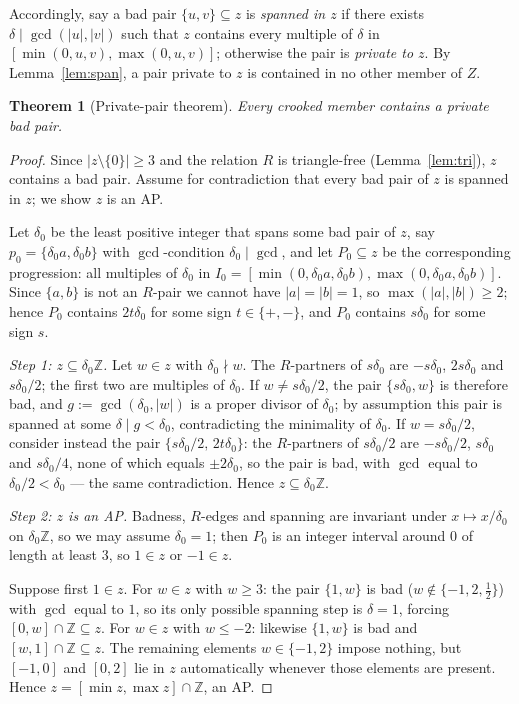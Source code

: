 \documentclass[11pt]{article}
\newtheorem{theorem}{Theorem}[section]
\theoremstyle{definition}
\newcommand{\Z}{\mathbb{Z}}
\begin{document}
Accordingly, say a bad pair $\{u,v\}\subseteq z$ is \emph{spanned in $z$} if there exists $\delta\mid\gcd(|u|,|v|)$ such that $z$ contains every multiple of $\delta$ in $[\min(0,u,v),\max(0,u,v)]$; otherwise the pair is \emph{private to $z$}. By Lemma~\ref{lem:span}, a pair private to $z$ is contained in no other member of $Z$.

\begin{theorem}[Private-pair theorem]\label{thm:private}
Every crooked member contains a private bad pair.
\end{theorem}

\begin{proof}
Since $|z\setminus\{0\}|\ge 3$ and the relation $R$ is triangle-free (Lemma~\ref{lem:tri}), $z$ contains a bad pair. Assume for contradiction that every bad pair of $z$ is spanned in $z$; we show $z$ is an AP.

Let $\delta_0$ be the least positive integer that spans some bad pair of $z$, say $p_0=\{\delta_0 a,\delta_0 b\}$ with $\gcd$-condition $\delta_0\mid\gcd$, and let $P_0\subseteq z$ be the corresponding progression: all multiples of $\delta_0$ in $I_0=[\min(0,\delta_0a,\delta_0b),\max(0,\delta_0a,\delta_0b)]$. Since $\{a,b\}$ is not an $R$-pair we cannot have $|a|=|b|=1$, so $\max(|a|,|b|)\ge2$; hence $P_0$ contains $2t\delta_0$ for some sign $t\in\{+,-\}$, and $P_0$ contains $s\delta_0$ for some sign $s$.

\emph{Step 1: $z\subseteq\delta_0\mathbb{Z}$.} Let $w\in z$ with $\delta_0\nmid w$. The $R$-partners of $s\delta_0$ are $-s\delta_0$, $2s\delta_0$ and $s\delta_0/2$; the first two are multiples of $\delta_0$. If $w\neq s\delta_0/2$, the pair $\{s\delta_0,w\}$ is therefore bad, and $g:=\gcd(\delta_0,|w|)$ is a proper divisor of $\delta_0$; by assumption this pair is spanned at some $\delta\mid g<\delta_0$, contradicting the minimality of $\delta_0$. If $w=s\delta_0/2$, consider instead the pair $\{s\delta_0/2,\,2t\delta_0\}$: the $R$-partners of $s\delta_0/2$ are $-s\delta_0/2$, $s\delta_0$ and $s\delta_0/4$, none of which equals $\pm2\delta_0$, so the pair is bad, with $\gcd$ equal to $\delta_0/2<\delta_0$ --- the same contradiction. Hence $z\subseteq\delta_0\mathbb{Z}$.

\emph{Step 2: $z$ is an AP.} Badness, $R$-edges and spanning are invariant under $x\mapsto x/\delta_0$ on $\delta_0\mathbb{Z}$, so we may assume $\delta_0=1$; then $P_0$ is an integer interval around $0$ of length at least $3$, so $1\in z$ or $-1\in z$.

Suppose first $1\in z$. For $w\in z$ with $w\ge3$: the pair $\{1,w\}$ is bad ($w\notin\{-1,2,\tfrac12\}$) with $\gcd$ equal to $1$, so its only possible spanning step is $\delta=1$, forcing $[0,w]\cap\Z\subseteq z$. For $w\in z$ with $w\le-2$: likewise $\{1,w\}$ is bad and $[w,1]\cap\Z\subseteq z$. The remaining elements $w\in\{-1,2\}$ impose nothing, but $[-1,0]$ and $[0,2]$ lie in $z$ automatically whenever those elements are present. Hence $z=[\min z,\max z]\cap\Z$, an AP.


\end{proof}
\end{document}
